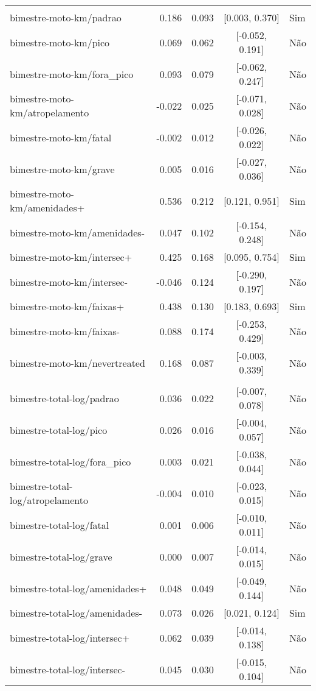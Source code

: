 \begin{longtable}{lrrcl}
 &  &  &  & \\
bimestre-moto-km/padrao & 0.186 & 0.093 & {}[0.003, 0.370] & Sim\\
bimestre-moto-km/pico & 0.069 & 0.062 & {}[-0.052, 0.191] & Não\\
bimestre-moto-km/fora\_pico & 0.093 & 0.079 & {}[-0.062, 0.247] & Não\\
bimestre-moto-km/atropelamento & -0.022 & 0.025 & {}[-0.071, 0.028] & Não\\
bimestre-moto-km/fatal & -0.002 & 0.012 & {}[-0.026, 0.022] & Não\\
bimestre-moto-km/grave & 0.005 & 0.016 & {}[-0.027, 0.036] & Não\\
bimestre-moto-km/amenidades+ & 0.536 & 0.212 & {}[0.121, 0.951] & Sim\\
bimestre-moto-km/amenidades- & 0.047 & 0.102 & {}[-0.154, 0.248] & Não\\
bimestre-moto-km/intersec+ & 0.425 & 0.168 & {}[0.095, 0.754] & Sim\\
bimestre-moto-km/intersec- & -0.046 & 0.124 & {}[-0.290, 0.197] & Não\\
bimestre-moto-km/faixas+ & 0.438 & 0.130 & {}[0.183, 0.693] & Sim\\
bimestre-moto-km/faixas- & 0.088 & 0.174 & {}[-0.253, 0.429] & Não\\
bimestre-moto-km/nevertreated & 0.168 & 0.087 & {}[-0.003, 0.339] & Não\\
 &  &  &  & \\
bimestre-total-log/padrao & 0.036 & 0.022 & {}[-0.007, 0.078] & Não\\
bimestre-total-log/pico & 0.026 & 0.016 & {}[-0.004, 0.057] & Não\\
bimestre-total-log/fora\_pico & 0.003 & 0.021 & {}[-0.038, 0.044] & Não\\
bimestre-total-log/atropelamento & -0.004 & 0.010 & {}[-0.023, 0.015] & Não\\
bimestre-total-log/fatal & 0.001 & 0.006 & {}[-0.010, 0.011] & Não\\
bimestre-total-log/grave & 0.000 & 0.007 & {}[-0.014, 0.015] & Não\\
bimestre-total-log/amenidades+ & 0.048 & 0.049 & {}[-0.049, 0.144] & Não\\
bimestre-total-log/amenidades- & 0.073 & 0.026 & {}[0.021, 0.124] & Sim\\
bimestre-total-log/intersec+ & 0.062 & 0.039 & {}[-0.014, 0.138] & Não\\
bimestre-total-log/intersec- & 0.045 & 0.030 & {}[-0.015, 0.104] & Não\\

\end{longtable}
